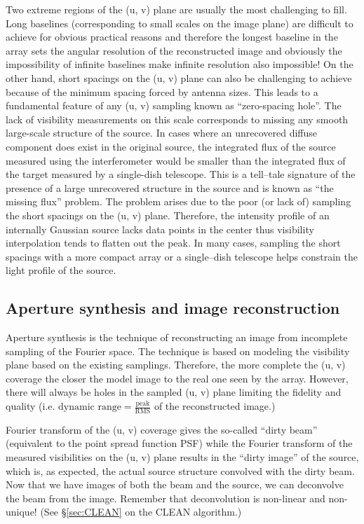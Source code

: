 \documentclass[a4wide,12pt]{book}
\begin{document}
Two extreme regions of the (u, v) plane are usually the most challenging to fill. Long baselines (corresponding to small scales on the image plane) are difficult to achieve for obvious practical reasons and therefore the longest baseline in the array sets the angular resolution of the reconstructed image and obviously the impossibility of infinite baselines make infinite resolution also impossible! On the other hand, short spacings on the (u, v) plane can also be challenging to achieve because of the minimum spacing forced by antenna sizes. This leads to a fundamental feature of any (u, v) sampling known as ``zero-spacing hole''. The lack of visibility measurements on this scale corresponds to missing any smooth large-scale structure of the source. In cases where an unrecovered diffuse component does exist in the original source, the integrated flux of the source measured using the interferometer would be smaller than the integrated flux of the target measured by a single-dish telescope. This is a tell--tale signature of the presence of a large unrecovered structure in the source and is known as ``the missing flux'' problem. The problem arises due to the poor (or lack of) sampling the short spacings on the (u, v) plane. Therefore, the intensity profile of an internally Gaussian source lacks data points in the center thus visibility interpolation tends to flatten out the peak. In many cases, sampling the short spacings with a more compact array or a single--dish telescope helps constrain the light profile of the source.

\subsection*{Aperture synthesis and image reconstruction}
Aperture synthesis is the technique of reconstructing an image from incomplete sampling of the Fourier space. The technique is based on modeling the visibility plane based on the existing samplings. Therefore, the more complete the (u, v) coverage the closer the model image to the real one seen by the array. However, there will always be holes in the sampled (u, v) plane limiting the fidelity and quality (i.e. $\text{dynamic range} = \frac{\text{peak}}{\text{RMS}}$ of the reconstructed image.)

Fourier transform of the (u, v) coverage gives the so-called ``dirty beam'' (equivalent to the point spread function PSF) while the Fourier transform of the measured visibilities on the (u, v) plane results in the ``dirty image'' of the source, which is, as expected, the actual source structure convolved with the dirty beam. Now that we have images of both the beam and the source, we can deconvolve the beam from the image. Remember that deconvolution is non-linear and non-unique! (See \S \ref{sec:CLEAN} on the CLEAN algorithm.)
\end{document}
